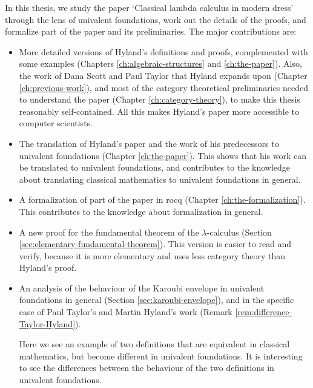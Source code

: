 In this thesis, we study the paper `Classical lambda calculus in modern dress' through the lens of univalent foundations, work out the details of the proofs, and formalize part of the paper and its preliminaries. The major contributions are:
\begin{itemize}
  \item More detailed versions of Hyland's definitions and proofs, complemented with some examples (Chapters \ref{ch:algebraic-structures} and \ref{ch:the-paper}). Also, the work of Dana Scott and Paul Taylor that Hyland expands upon (Chapter \ref{ch:previous-work}), and most of the category theoretical preliminaries needed to understand the paper (Chapter \ref{ch:category-theory}), to make this thesis reasonably self-contained. All this makes Hyland's paper more accessible to computer scientists.
  \item The translation of Hyland's paper and the work of his predecessors to univalent foundations (Chapter \ref{ch:the-paper}). This shows that his work can be translated to univalent foundations, and contributes to the knowledge about translating classical mathematics to univalent foundations in general.
  \item A formalization of part of the paper in rocq (Chapter \ref{ch:the-formalization}). This contributes to the knowledge about formalization in general.
  \item A new proof for the fundamental theorem of the $ \lambda $-calculus (Section \ref{sec:elementary-fundamental-theorem}). This version is easier to read and verify, because it is more elementary and uses less category theory than Hyland's proof.
  \item An analysis of the behaviour of the Karoubi envelope in univalent foundations in general (Section \ref{sec:karoubi-envelope}), and in the specific case of Paul Taylor's and Martin Hyland's work (Remark \ref{rem:difference-Taylor-Hyland}).


  Here we see an example of two definitions that are equivalent in classical mathematics, but become different in univalent foundations. It is interesting to see the differences between the behaviour of the two definitions in univalent foundations.
\end{itemize}

